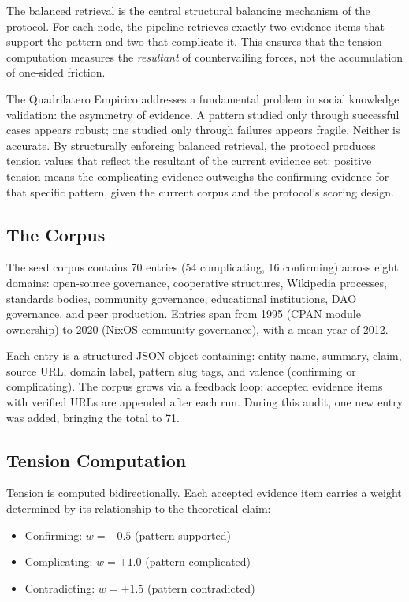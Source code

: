 \documentclass[10pt,twocolumn]{article}
\begin{document}
The balanced retrieval is the central structural balancing mechanism of the protocol. For each node, the pipeline retrieves exactly two evidence items that support the pattern and two that complicate it. This ensures that the tension computation measures the \emph{resultant} of countervailing forces, not the accumulation of one-sided friction.

The Quadrilatero Empirico addresses a fundamental problem in social knowledge validation: the asymmetry of evidence. A pattern studied only through successful cases appears robust; one studied only through failures appears fragile. Neither is accurate. By structurally enforcing balanced retrieval, the protocol produces tension values that reflect the resultant of the current evidence set: positive tension means the complicating evidence outweighs the confirming evidence for that specific pattern, given the current corpus and the protocol's scoring design.

\subsection{The Corpus}
\label{subsec:corpus}

The seed corpus contains 70 entries (54 complicating, 16 confirming) across eight domains: open-source governance, cooperative structures, Wikipedia processes, standards bodies, community governance, educational institutions, DAO governance, and peer production. Entries span from 1995 (CPAN module ownership) to 2020 (NixOS community governance), with a mean year of 2012.

Each entry is a structured JSON object containing: entity name, summary, claim, source URL, domain label, pattern slug tags, and valence (confirming or complicating). The corpus grows via a feedback loop: accepted evidence items with verified URLs are appended after each run. During this audit, one new entry was added, bringing the total to 71.

\subsection{Tension Computation}
\label{subsec:tension}

Tension is computed bidirectionally. Each accepted evidence item carries a weight determined by its relationship to the theoretical claim:
\begin{itemize}
    \item Confirming: $w = -0.5$ (pattern supported)
    \item Complicating: $w = +1.0$ (pattern complicated)
    \item Contradicting: $w = +1.5$ (pattern contradicted)
\end{itemize}
\end{document}
